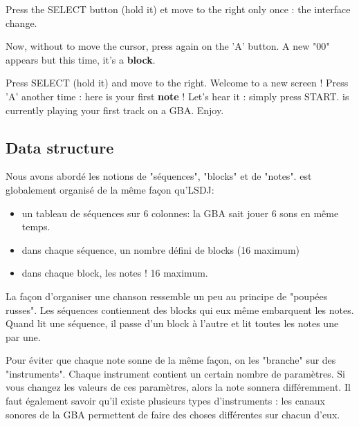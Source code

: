 \documentclass[12pt,a4paper]{article}
\begin{document}
    
    Press the SELECT button (hold it) et move to the right only once : the interface change.


    Now, without to move the cursor, press again on the 'A' button. A new "00" appears but this time, it's a {\bf block}.


    Press SELECT (hold it) and move to the right. Welcome to a new screen !
    Press 'A' another time : here is your first {\bf note} !
    Let's hear it : simply press START. \FAT is currently playing your first track on a GBA. Enjoy.

    
    \subsection{Data structure}
    
    Nous avons abordé les notions de "séquences", "blocks" et de "notes". \FAT est globalement organisé de la même façon qu'LSDJ:
    \begin{itemize}
        \item{un tableau de séquences sur 6 colonnes: la GBA sait jouer 6 sons en même temps.}
        \item{dans chaque séquence, un nombre défini de blocks (16 maximum)}
        \item{dans chaque block, les notes ! 16 maximum.}
    \end{itemize}\medskip
    
    La façon d'organiser une chanson ressemble un peu au principe de "poupées russes". Les séquences contiennent des blocks qui eux même embarquent les notes. Quand \FAT lit une séquence, il passe d'un block à l'autre et lit toutes les notes une par une.\medskip
    
    Pour éviter que chaque note sonne de la même façon, on les "branche" sur des "instruments". Chaque instrument contient un certain nombre de paramètres. Si vous changez les valeurs de ces paramètres, alors la note sonnera différemment. Il faut également savoir qu'il existe plusieurs types d'instruments : les canaux sonores de la GBA permettent de faire des choses différentes sur chacun d'eux.
    
\end{document}
